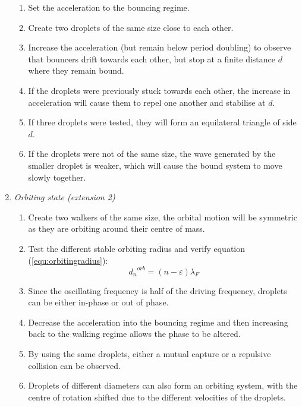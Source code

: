 \begin{enumerate}
\begin{enumerate}

\item  Set the acceleration to the bouncing regime.
\item  Create two droplets of the same size close to each other.
\item  Increase the acceleration (but remain below period doubling) to observe that bouncers drift towards each other, but stop at a finite distance $d$ where they remain bound.
\item  If the droplets were previously stuck towards each other, the increase in acceleration will cause them to repel one another and stabilise at $d$.
\item  If three droplets were tested, they will form an equilateral triangle of side $d$.
\item  If the droplets were not of the same size, the wave generated by the smaller droplet is weaker, which will cause the bound system to move slowly together.


\end{enumerate}

\item \textit{Orbiting state (extension 2)}



\begin{enumerate}
\item \textbf{ }Create two walkers of the same size, the orbital motion will be symmetric as they are orbiting around their centre of mass.

\item  Test the different stable orbiting radius and verify equation (\ref{equ:orbitingradius})\cite{protiere2006particle}:
\begin{equation}
    {d_n}^{orb}=\left(n-\varepsilon \right){\lambda }_F
    \label{equ:orbitingradius}
\end{equation}

\item  Since the oscillating frequency is half of the driving frequency, droplets can be either in-phase or out of phase.

\item  Decrease the acceleration into the bouncing regime and then increasing back to the walking regime allows the phase to be altered.

\item  By using the same droplets, either a mutual capture or a repulsive collision can be observed.

\item  Droplets of different diameters can also form an orbiting system, with the centre of rotation shifted due to the different velocities of the droplets.
\end{enumerate}

\end{enumerate}
